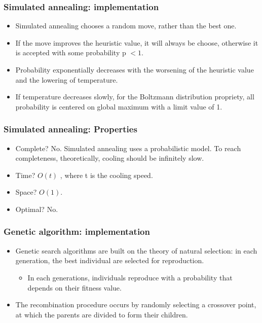 \documentclass{beamer}
\begin{document}
    \begin{frame}
    \frametitle{Simulated annealing: implementation}
    \begin{itemize}
        \item Simulated annealing chooses a random move, rather than the best one.
        \pause
        \item If the move improves the heuristic value, it will always be choose, otherwise it is accepted with some probability p \begin{math}< 1\end{math}.
        \pause
        \item Probability exponentially decreases with the worsening of the heuristic value and the lowering of temperature.
        \pause
        \item If temperature decreases slowly, for the Boltzmann distribution propriety, all probability is centered on global maximum with a limit value of 1.
    \end{itemize}
    \end{frame}

    \begin{frame}
    \frametitle{Simulated annealing: Properties}
     \begin{itemize}
         \item Complete? \pause No. \pause Simulated annealing uses a probabilistic model. To reach completeness, theoretically,  cooling should be infinitely slow.
         \pause
         \item Time? \pause 
         \begin{math}O(t)\end{math}
         , where t is the cooling speed.
         \pause
         \item Space? \pause
         \begin{math}O(1).\end{math}
         \pause
         \item Optimal? \pause No.
     \end{itemize}   
    \end{frame}

    \begin{frame}
    \frametitle{Genetic algorithm: implementation}
        \begin{itemize}
            \item Genetic search algorithms are built on the theory of natural selection: in each generation, the best individual are selected for reproduction.
            \pause
            \begin{itemize}
                \item In each generations, individuals reproduce with a probability that depends on their fitness value.
            \end{itemize}
            \pause
            \item The recombination procedure occurs by randomly selecting a crossover point, at which the parents are divided to form their children.
        \end{itemize}
    \end{frame}
\end{document}
